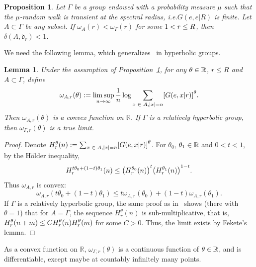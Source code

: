 \documentclass[10pt]{amsart}
\newtheorem{lemm}[theo]{Lemma}\newtheorem{prop}[theo]{Proposition}\newtheorem{coro}[theo]{Corollary}\newtheorem{conj}[theo]{Conjecture}
\theoremstyle{definition}\newtheorem{defi}[theo]{Definition}\newtheorem{rema}[theo]{Remark}\newtheorem{exam}[theo]{Example}\newtheorem{exem}[theo]{Example}\newtheorem{nota}[theo]{Notation}
\newcommand{\R}{\mathbb{R}}
\newcommand{\fkd}{\mathfrak{d}}
\let\originalleft\left
\let\originalright\right
\renewcommand{\left}{\mathopen{}\mathclose\bgroup\originalleft}
\renewcommand{\right}{\aftergroup\egroup\originalright}
\let\oldin\in
\renewcommand{\in}{\mathchoice{\oldin}{\oldin}{\,\oldin\,}{\,\oldin\,}}
\let\oldle\le
\renewcommand{\le}{\mathchoice{\oldle}{\oldle}{\,\oldle\,}{\,\oldle\,}}
\renewcommand*{\to}{\mathchoice{\longrightarrow}{\rightarrow}{\rightarrow}{\rightarrow}}
\begin{document}
\begin{prop}\label{PropTwoPGs}
Let $\Gamma$ be a group endowed with a probability measure $\mu$ such that the $\mu$-random walk is transient at the spectral radius, i.e.$G(e,e|R)$ is finite. Let $A\subset \Gamma$ be any subset. If $\omega_A(r)<\omega_\Gamma(r)$ for some $1<r\le R $, then $\delta(A,\fkd_r)<1$.
\end{prop}

We need the following lemma, which generalizes~\cite[Lemma~3.1]{Tanaka17} in hyperbolic groups.
\begin{lemm}\label{ContinuitythetaLem}
Under the assumption of Proposition~\ref{PropTwoPGs}, for any $\theta\in\R$, $r\leq R$ and $A\subset \Gamma$, define
\[
\omega_{A, r}(\theta) := \limsup_{n \to \infty} \frac{1}{n} \log \sum_{x \in A, |x| = n} \left[G(e, x | r) \right]^\theta.
\]
Then $\omega_{A, r}(\theta)$ is a convex function on $\R$. If $\Gamma$ is a relatively hyperbolic group, then $\omega_{\Gamma, r}(\theta)$ is a true limit.
\end{lemm}
\begin{proof}
Denote $H^\theta_r(n):=\sum_{x \in A, |x| = n} \left[G(e, x | r) \right]^\theta$. For $\theta_0$, $\theta_1 \in \R$ and $0 < t < 1$, by the H\"older inequality,
\[
H_r^{t \theta_0 + (1 - t) \theta_1}(n)
\leq \left(H_r^{\theta_0}(n)\right)^t \left(H_r^{\theta_1}(n)\right)^{1 - t}.
\]
Thus $\omega_{A, r}$ is convex:
\[
\omega_{A, r}(t \theta_0 + (1 - t) \theta_1) \leq t \omega_{A, r}(\theta_0) + (1 - t) \omega_{A, r}(\theta_1).
\]
If $\Gamma$ is a relatively hyperbolic group, the same proof as in~\cite[Lemma~3.2]{DWY} shows (there with $\theta=1$) that for $A=\Gamma$, the sequence $H_r^\theta(n)$ is sub-multiplicative, that is, $H_r^\theta(n+m)\le C H_r^\theta(n) H_r^\theta(m)$ for some $C>0$. Thus, the limit exists by Fekete's lemma.
\end{proof}

As a convex function on $\R$, $\omega_{\Gamma, r}(\theta)$ is a continuous function of $\theta\in \R$, and is differentiable, except maybe at countably infinitely many points.
\end{document}
